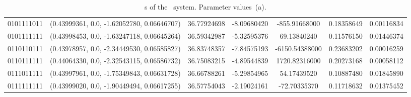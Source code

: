 \begin{table}
\begin{tabular}{c|c|c|c|c|c|c}
 	0101111011 & (0.43999361,   0.0, -1.62052780, 0.06646707) & 36.77924698 & -8.09680420 & -855.91668000 &0.18358649 &0.00116834 \\ 
 	0101111111 & (0.43998453,   0.0, -1.63247118, 0.06645264) & 36.59342987 & -5.32595376 & 69.13840240 &0.11576150 &0.01446374 \\ 
 	0110110111 & (0.43978957,   0.0, -2.34449530, 0.06585827) & 36.83748357 & -7.84575193 & -6150.54388000 &0.23683202 &0.00016259 \\ 
 	0110111111 & (0.44064330,   0.0, -2.32543115, 0.06586732) & 36.75083215 & -4.89544839 & 1720.82316000 &0.20273168 &0.00058112 \\ 
 	0111011111 & (0.43997961,   0.0, -1.75349843, 0.06631728) & 36.66788261 & -5.29854965 & 54.17439520 &0.10887480 &0.01845890 \\ 
 	0111111111 & (0.43999020,   0.0, -1.90449494, 0.06617255) & 36.57754043 & -2.19024161 & -72.70335370 &0.11718632 &0.01375452 \\ 
 	\end{tabular}
	\caption{\rpo s of the \twoMode\ system. Parameter values \,(a).}
	\label{t-rpo2modeupto8}
\end{table}